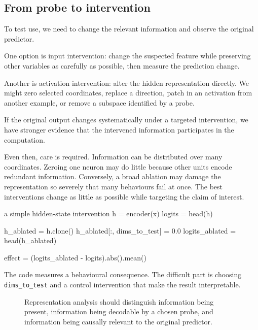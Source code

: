 \subsection{From probe to intervention}

To test use, we need to change the relevant information and observe the original predictor.

One option is input intervention: change the suspected feature while preserving other variables as carefully as possible, then measure the prediction change.

Another is activation intervention: alter the hidden representation directly. We might zero selected coordinates, replace a direction, patch in an activation from another example, or remove a subspace identified by a probe.

If the original output changes systematically under a targeted intervention, we have stronger evidence that the intervened information participates in the computation.

Even then, care is required. Information can be distributed over many coordinates. Zeroing one neuron may do little because other units encode redundant information. Conversely, a broad ablation may damage the representation so severely that many behaviours fail at once. The best interventions change as little as possible while targeting the claim of interest.

\begin{pytorchbox}{a simple hidden-state intervention}
h = encoder(x)
logits = head(h)

h_ablated = h.clone()
h_ablated[:, dims_to_test] = 0.0
logits_ablated = head(h_ablated)

effect = (logits_ablated - logits).abs().mean()
\end{pytorchbox}

The code measures a behavioural consequence. The difficult part is choosing \texttt{dims\_to\_test} and a control intervention that make the result interpretable.

\begin{figure}[ht]
  \caption{Representation analysis should distinguish information being present, information being decodable by a chosen probe, and information being causally relevant to the original predictor.}
  \label{fig:week6-probe-use}
\end{figure}

